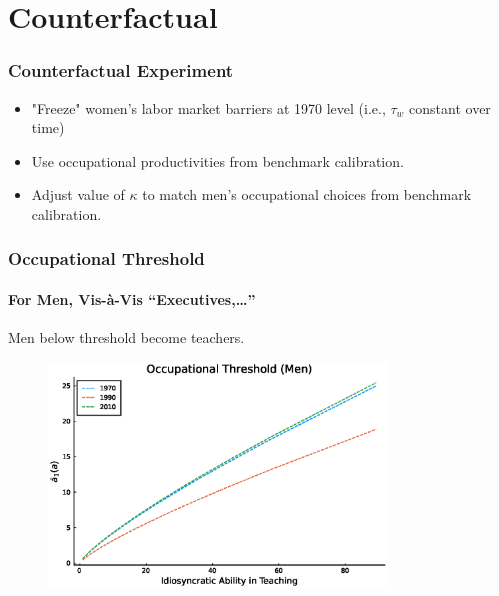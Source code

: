 \documentclass[11pt]{beamer}
\begin{document}
\section{Counterfactual}

\begin{frame}
\frametitle{Counterfactual Experiment}
\begin{itemize}
  \item "Freeze" women's labor market barriers at 1970 level (i.e., $\tau_w$ constant over time)
  \item Use occupational productivities from benchmark calibration.
  \item Adjust value of $\kappa$ to match men's occupational choices from benchmark calibration.
\end{itemize}

\end{frame}

\begin{frame}
\frametitle{Occupational Threshold}
\framesubtitle{For Men, Vis-\`a-Vis ``Executives,\ldots''}
Men below threshold become teachers.
\begin{figure}
 \begin{center}
\includegraphics[width=0.8\textwidth]{plots/counterfactuals/counter_1/a_O_men.eps}
 			\label{ }
 		\end{center}
 	\end{figure}
\end{frame}
\end{document}
